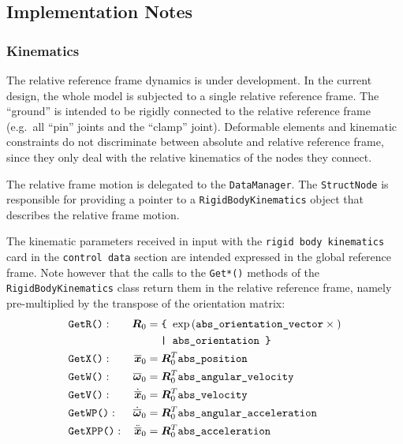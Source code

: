 \documentclass[10pt,dvips,fleqn,subeqn]{report}
\newcommand{\T}[1]{\bm{#1}}
\newcommand{\TT}[1]{\bm{#1}}
\begin{document}
\subsection{Implementation Notes}
\label{sec:nodes:structural nodes:implementation notes}

\subsubsection{Kinematics}
The relative reference frame dynamics is under development.
In the current design, the whole model is subjected 
to a single relative reference frame.
The ``ground'' is intended to be rigidly connected
to the relative reference frame (e.g.\ all ``pin'' joints
and the ``clamp'' joint).
Deformable elements and kinematic constraints do not discriminate
between absolute and relative reference frame, since they only deal
with the relative kinematics of the nodes they connect.

The relative frame motion is delegated to the \texttt{DataManager}.
The \texttt{StructNode} is responsible for providing a pointer
to a \texttt{RigidBodyKinematics} object that describes
the relative frame motion.

The kinematic parameters received in input with the
\texttt{rigid body kinematics} card in the \texttt{control data} section
are intended expressed in the global reference frame.
Note however that the calls to the \texttt{Get*()} methods
of the \texttt{RigidBodyKinematics} class return them
in the relative reference frame, namely pre-multiplied
by the transpose of the orientation matrix:
\begin{subequations}
\begin{align}
	& \texttt{GetR()}:
	& \TT{R}_0 &= \texttt{\{ } \mathrm{exp}\plbr{
		\texttt{abs\_orientation\_vector}\times{}
	} \nonumber \\
	& & & \hphantom{=} \texttt{ | abs\_orientation \} } \\
	& \texttt{GetX()}:
	& \overline{\T{x}}_0 &= \TT{R}_0^T \texttt{abs\_position} \\
	& \texttt{GetW()}:
	& \overline{\T{\omega}}_0 &= \TT{R}_0^T \texttt{abs\_angular\_velocity} \\
	& \texttt{GetV()}:
	& \dot{\overline{\T{x}}}_0 &= \TT{R}_0^T \texttt{abs\_velocity} \\
	& \texttt{GetWP()}:
	& \dot{\overline{\T{\omega}}}_0 &= \TT{R}_0^T \texttt{abs\_angular\_acceleration} \\
	& \texttt{GetXPP()}:
	& \ddot{\overline{\T{x}}}_0 &= \TT{R}_0^T \texttt{abs\_acceleration}
\end{align}
\end{subequations}
\end{document}
